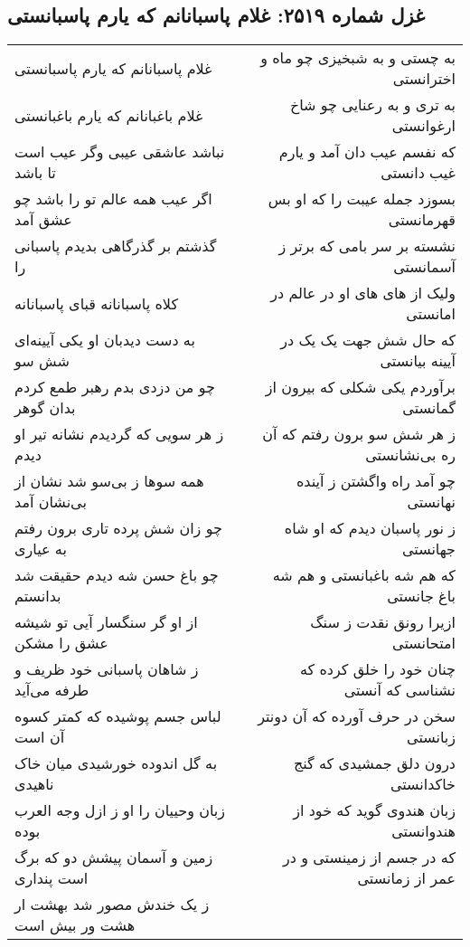 \begin{center}
\section*{غزل شماره ۲۵۱۹: غلام پاسبانانم که یارم پاسبانستی}
\label{sec:2519}
\begin{longtable}{l p{0.5cm} r}
غلام پاسبانانم که یارم پاسبانستی
&&
به چستی و به شبخیزی چو ماه و اخترانستی
\\
غلام باغبانانم که یارم باغبانستی
&&
به تری و به رعنایی چو شاخ ارغوانستی
\\
نباشد عاشقی عیبی وگر عیب است تا باشد
&&
که نفسم عیب دان آمد و یارم غیب دانستی
\\
اگر عیب همه عالم تو را باشد چو عشق آمد
&&
بسوزد جمله عیبت را که او بس قهرمانستی
\\
گذشتم بر گذرگاهی بدیدم پاسبانی را
&&
نشسته بر سر بامی که برتر ز آسمانستی
\\
کلاه پاسبانانه قبای پاسبانانه
&&
ولیک از های های او در عالم در امانستی
\\
به دست دیدبان او یکی آیینه‌ای شش سو
&&
که حال شش جهت یک یک در آیینه بیانستی
\\
چو من دزدی بدم رهبر طمع کردم بدان گوهر
&&
برآوردم یکی شکلی که بیرون از گمانستی
\\
ز هر سویی که گردیدم نشانه تیر او دیدم
&&
ز هر شش سو برون رفتم که آن ره بی‌نشانستی
\\
همه سوها ز بی‌سو شد نشان از بی‌نشان آمد
&&
چو آمد راه واگشتن ز آینده نهانستی
\\
چو زان شش پرده تاری برون رفتم به عیاری
&&
ز نور پاسبان دیدم که او شاه جهانستی
\\
چو باغ حسن شه دیدم حقیقت شد بدانستم
&&
که هم شه باغبانستی و هم شه باغ جانستی
\\
از او گر سنگسار آیی تو شیشه عشق را مشکن
&&
ازیرا رونق نقدت ز سنگ امتحانستی
\\
ز شاهان پاسبانی خود ظریف و طرفه می‌آید
&&
چنان خود را خلق کرده که نشناسی که آنستی
\\
لباس جسم پوشیده که کمتر کسوه آن است
&&
سخن در حرف آورده که آن دونتر زبانستی
\\
به گل اندوده خورشیدی میان خاک ناهیدی
&&
درون دلق جمشیدی که گنج خاکدانستی
\\
زبان وحییان را او ز ازل وجه العرب بوده
&&
زبان هندوی گوید که خود از هندوانستی
\\
زمین و آسمان پیشش دو که برگ است پنداری
&&
که در جسم از زمینستی و در عمر از زمانستی
\\
ز یک خندش مصور شد بهشت ار هشت ور بیش است

\end{longtable}
\end{center}
